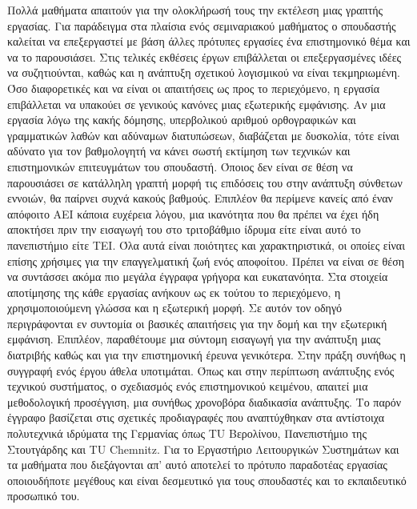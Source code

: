 Πολλά μαθήματα απαιτούν για την ολοκλήρωσή τους την εκτέλεση μιας γραπτής εργασίας. Για παράδειγμα στα πλαίσια ενός σεμιναριακού μαθήματος ο σπουδαστής καλείται να επεξεργαστεί με βάση άλλες πρότυπες εργασίες ένα επιστημονικό θέμα και να το παρουσιάσει.
Στις τελικές εκθέσεις έργων επιβάλλεται οι επεξεργασμένες ιδέες να συζητιούνται, καθώς και η ανάπτυξη σχετικού λογισμικού να είναι τεκμηριωμένη. Όσο διαφορετικές και να είναι οι απαιτήσεις ως προς το περιεχόμενο, η εργασία επιβάλλεται να υπακούει σε γενικούς κανόνες μιας εξωτερικής εμφάνισης. Αν μια εργασία λόγω της κακής δόμησης, υπερβολικού αριθμού ορθογραφικών και γραμματικών λαθών και αδύναμων διατυπώσεων, διαβάζεται με δυσκολία, τότε είναι αδύνατο για τον βαθμολογητή να κάνει σωστή εκτίμηση των τεχνικών και επιστημονικών επιτευγμάτων του σπουδαστή. Όποιος δεν είναι σε θέση να παρουσιάσει σε κατάλληλη γραπτή μορφή τις επιδόσεις του στην ανάπτυξη σύνθετων εννοιών, θα παίρνει συχνά κακούς βαθμούς. Επιπλέον θα περίμενε κανείς από έναν απόφοιτο ΑΕΙ κάποια ευχέρεια λόγου, μια ικανότητα που θα πρέπει να έχει ήδη αποκτήσει πριν την εισαγωγή του στο τριτοβάθμιο ίδρυμα είτε είναι αυτό το πανεπιστήμιο είτε ΤΕΙ. Όλα αυτά είναι ποιότητες και χαρακτηριστικά, οι οποίες είναι επίσης χρήσιμες για την επαγγελματική ζωή ενός αποφοίτου. Πρέπει να είναι σε θέση να συντάσσει ακόμα πιο μεγάλα έγγραφα γρήγορα και ευκατανόητα.
Στα στοιχεία αποτίμησης της κάθε εργασίας ανήκουν ως εκ τούτου το περιεχόμενο, η χρησιμοποιούμενη γλώσσα και η εξωτερική μορφή. Σε αυτόν τον οδηγό περιγράφονται εν συντομία οι βασικές απαιτήσεις για την δομή και την εξωτερική εμφάνιση. Επιπλέον, παραθέτουμε μια σύντομη εισαγωγή για την ανάπτυξη μιας διατριβής καθώς και για την επιστημονική έρευνα γενικότερα.
Στην πράξη συνήθως η συγγραφή ενός έργου άθελα υποτιμάται. Όπως και στην περίπτωση ανάπτυξης ενός τεχνικού συστήματος, ο σχεδιασμός ενός επιστημονικού κειμένου, απαιτεί μια μεθοδολογική προσέγγιση, μια συνήθως χρονοβόρα διαδικασία ανάπτυξης. Το παρόν έγγραφο βασίζεται στις σχετικές προδιαγραφές που αναπτύχθηκαν στα αντίστοιχα πολυτεχνικά ιδρύματα της Γερμανίας όπως TU Βερολίνου, Πανεπιστήμιο της Στουτγάρδης και TU Chemnitz.
Για το Εργαστήριο Λειτουργικών Συστημάτων και τα μαθήματα που διεξάγονται απ' αυτό αποτελεί το πρότυπο παραδοτέας εργασίας οποιουδήποτε μεγέθους και είναι δεσμευτικό για τους σπουδαστές και το εκπαιδευτικό προσωπικό του.

